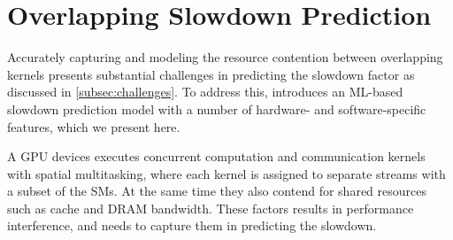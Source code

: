 
\section{Overlapping Slowdown Prediction} 
\label{sec:overlap_pred} 
\noindent Accurately capturing and modeling the resource contention between overlapping kernels presents substantial challenges in predicting the slowdown factor as discussed in \cref{subsec:challenges}. 
To address this, \sys introduces an ML-based slowdown prediction model with a number of hardware- and software-specific features, which we present here.


A GPU devices executes concurrent computation and communication kernels with spatial multitasking, where each kernel is assigned to separate streams with a subset of the SMs.
At the same time they also contend for shared resources such as cache and DRAM bandwidth.
These factors results in performance interference, and \sys needs to capture them in predicting the slowdown. 


